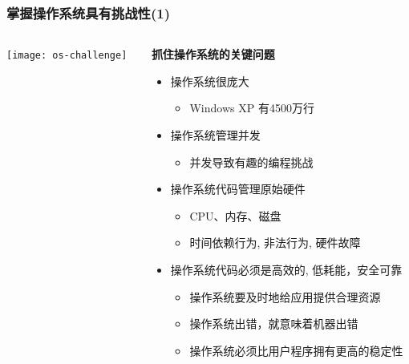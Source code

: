\begin{frame}
    \frametitle{掌握操作系统具有挑战性(1)}
    
    \begin{columns}
    	
    \begin{column}{0.3\textwidth}	
      \texttt{[image: os-challenge]}	
    \end{column}

	\begin{column}{0.7\textwidth}
    
    \textbf{抓住操作系统的关键问题}
    \begin{itemize}
        \item 操作系统很庞大
            \begin{itemize}
                \item Windows XP 有4500万行
            \end{itemize} \pause
        \item 操作系统管理并发
            \begin{itemize}
                \item 并发导致有趣的编程挑战
            \end{itemize} \pause
        \item 操作系统代码管理原始硬件
            \begin{itemize}
               \item CPU、内存、磁盘
                \item 时间依赖行为, 非法行为, 硬件故障
            \end{itemize} \pause
        \item 操作系统代码必须是高效的, 低耗能，安全可靠 \pause
            \begin{itemize}
            	\item 操作系统要及时地给应用提供合理资源
                \item 操作系统出错，就意味着机器出错
                \item 操作系统必须比用户程序拥有更高的稳定性
            \end{itemize}
        
    \end{itemize}
    \end{column}

    \end{columns}

\end{frame}


